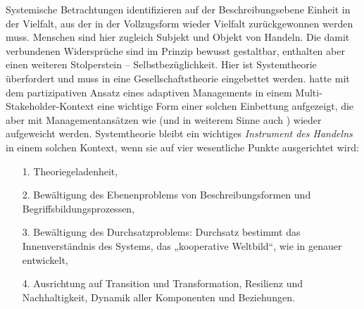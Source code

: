 \documentclass[12pt,a4paper]{article}
\begin{document}
Systemische Betrachtungen identifizieren auf der Beschreibungsebene Einheit in
der Vielfalt, aus der in der Vollzugsform wieder Vielfalt zurückgewonnen
werden muss. Menschen sind hier zugleich Subjekt und Objekt von Handeln.  Die
damit verbundenen Widersprüche sind im Prinzip bewusst gestaltbar, enthalten
aber einen weiteren Stolperstein -- Selbstbezüglichkeit. Hier ist
Systemtheorie überfordert und muss in eine Gesellschaftstheorie eingebettet
werden.  \cite{Foxon2009} hatte mit dem partizipativen Ansatz eines adaptiven
Managements in einem Multi-Stakeholder-Kontext eine wichtige Form einer
solchen Einbettung aufgezeigt, die aber mit Managementansätzen wie
\cite{Snowden2007} (und in weiterem Sinne auch \cite{TESE2018}) wieder
aufgeweicht werden.  Systemtheorie bleibt ein wichtiges \emph{Instrument des
  Handelns} in einem solchen Kontext, wenn sie auf vier wesentliche Punkte
ausgerichtet wird:
\begin{itemize}\itemsep0pt
\item[1.] Theoriegeladenheit,
\item[2.] Bewältigung des Ebenenproblems von Beschreibungsformen und
  Begriffsbildungsprozessen,
\item[3.] Bewältigung des Durchsatzproblems: Durchsatz bestimmt das
  Innenverständnis des Systems, das „kooperative Weltbild“, wie in
  \cite{Graebe2020a} genauer entwickelt,
\item[4.] Ausrichtung auf Transition und Transformation, Resilienz und
  Nachhaltigkeit, Dynamik aller Komponenten und Beziehungen.
\end{itemize}
\end{document}
